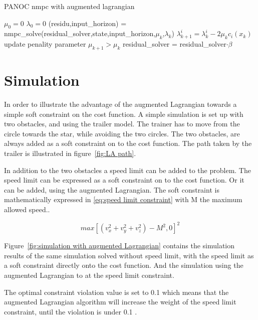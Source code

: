	\begin{algorithm}
		\caption{PANOC nmpc with augmented lagrangian}
		\label{alg:PANOC with augmented lagrangian}
		\begin{algorithmic}[1]
			\State $\mu_0=0$
			\State $\lambda_0=0$
			\State (residu,input\_horizon) = nmpc\_solve(residual\_solver,state,input\_horizon,$\mu_k$,$\lambda_k$)
			\State $\lambda_{k+1}^{i} = \lambda_{k}^{i} - 2\mu_k c_i(x_k)$
			\State update penality parameter $\mu_{k+1}>\mu_k$
			\State residual\_solver =  residual\_solver$\cdot \beta$
			\EndWhile
			\EndProcedure
		\end{algorithmic}
	\end{algorithm}

\section{Simulation}
In order to illustrate the advantage of the augmented Lagrangian towards a simple soft constraint on the cost function. A simple simulation is set up with two obstacles, and using the trailer model. The trainer has to move from the circle towards the star, while avoiding the two circles. The two obstacles, are always added as a soft constraint on to the cost function. The path taken by the trailer is illustrated in figure~\ref{fig:LA path}.

In addition to the two obstacles a speed limit can be added to the problem. The speed limit can be expressed as a soft constraint on to the cost function. Or it can be added, using the augmented Lagrangian. The soft constraint is mathematically expressed in \eqref{eq:speed limit constraint} with M the maximum allowed speed..

\begin{equation}
max[(v_x^2+v_y^2+v_z^2)-M^2,0]^2
\label{eq:speed limit constraint}
\end{equation}

Figure~\ref{fig:simulation with augmented Lagrangian} contains the simulation results of the same simulation solved without speed limit, with the speed limit as a soft constraint directly onto the cost function. And the simulation using the augmented Lagrangian to at the speed limit constraint.

The optimal constraint violation value is set to 0.1 which means that the augmented Lagrangian algorithm will increase the weight of the speed limit constraint, until the violation is under 0.1 . 

